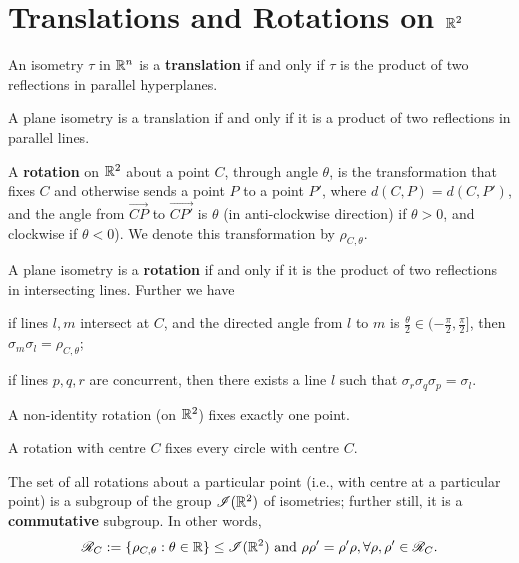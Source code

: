 \section{Translations and Rotations on \(\mathbb{R}^2\)}

\begin{theorem}
    An isometry \(\tau\) in \(\mathbb{R}^n\) is a \textbf{translation} if and only if \(\tau\) is the product of two reflections in parallel hyperplanes.
\end{theorem}

\begin{corollary}
    A plane isometry is a translation if and only if it is a product of two reflections in parallel lines.
\end{corollary}

\begin{definition}
    A \textbf{rotation} on \(\mathbb{R}^2\) about a point \(C\), through angle \(\theta\), is the transformation that fixes \(C\) and otherwise sends a point \(P\) to a point \(P'\), where \(d(C, P) = d(C, P')\), and the angle from \(\vec{CP}\) to \(\vec{CP'}\) is \(\theta\) (in anti-clockwise direction) if \(\theta > 0\), and clockwise if \(\theta < 0\)). We denote this transformation by \(\rho_{C, \theta}\).
\end{definition}

\begin{theorem}
    A plane isometry is a \textbf{rotation} if and only if it is the product of two reflections in intersecting lines. Further we have
    \begin{statements}{}
        \item if lines \(l, m\) intersect at \(C\), and the directed angle from \(l\) to \(m\) is \(\frac{\theta}{2} \in (-\frac{\pi}{2}, \frac{\pi}{2}]\), then \(\sigma_m \sigma_l = \rho_{C, \theta}\);
        \item if lines \(p, q, r\) are concurrent, then there exists a line \(l\) such that \(\sigma_r \sigma_q \sigma_p = \sigma_l\).
    \end{statements}
\end{theorem}

\begin{corollary}
    \begin{statements}{}
        \item A non-identity rotation (on \(\mathbb{R}^2\)) fixes exactly one point.
        \item A rotation with centre \(C\) fixes every circle with centre \(C\).
        \item The set of all rotations about a particular point (i.e., with centre at a particular point) is a subgroup of the group \(\mathscr{I}(\mathbb{R}^2)\) of isometries; further still, it is a \textbf{commutative} subgroup. In other words,
        \[\mathscr{R}_C := \{\rho_{C, \theta} : \theta \in \mathbb{R} \} \leq \mathscr{I}(\mathbb{R}^2) \text{ and } \rho\rho' = \rho'\rho, \forall \rho, \rho' \in \mathscr{R}_C.\]
    \end{statements}
\end{corollary}

